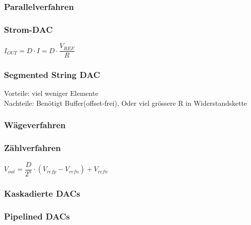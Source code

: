 \subsubsection{Parallelverfahren}
\subsubsection{Strom-DAC}
$I_{OUT} = D\cdot I = D \cdot \dfrac{V_{REF}}{R}$
\subsubsection{Segmented String DAC}
Vorteile: viel weniger Elemente\\
Nachteile: Benötigt Buffer(offset-frei), Oder viel grössere R in Widerstandskette
\subsubsection{Wägeverfahren}

\subsubsection{Zählverfahren}
$V_{out} = \dfrac{D}{2^n}\cdot (V_{refp}-V_{refn})+V_{refn}$

\subsubsection{Kaskadierte DACs}

\subsubsection{Pipelined DACs}
